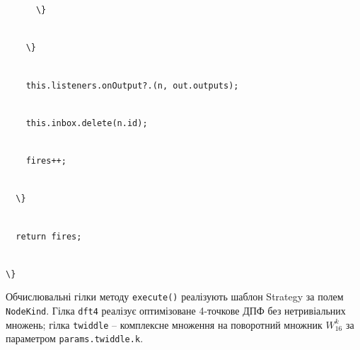 \documentclass[
]{article}
\newcommand{\passthrough}[1]{#1}
\begin{document}
\passthrough{\lstinline!      !}\passthrough{\lstinline!\}!}\strut \\
\passthrough{\lstinline!    !}\passthrough{\lstinline!\}!}\strut \\
\passthrough{\lstinline!    !}\passthrough{\lstinline!this!}\passthrough{\lstinline!.!}\passthrough{\lstinline!listeners!}\passthrough{\lstinline!.!}\passthrough{\lstinline!onOutput!}\passthrough{\lstinline!?.(!}\passthrough{\lstinline!n!}\passthrough{\lstinline!,!}\passthrough{\lstinline! !}\passthrough{\lstinline!out!}\passthrough{\lstinline!.!}\passthrough{\lstinline!outputs!}\passthrough{\lstinline!);!}\strut \\
\passthrough{\lstinline!    !}\passthrough{\lstinline!this!}\passthrough{\lstinline!.!}\passthrough{\lstinline!inbox!}\passthrough{\lstinline!.!}\passthrough{\lstinline!delete!}\passthrough{\lstinline!(!}\passthrough{\lstinline!n!}\passthrough{\lstinline!.!}\passthrough{\lstinline!id!}\passthrough{\lstinline!);!}\strut \\
\passthrough{\lstinline!    !}\passthrough{\lstinline!fires!}\passthrough{\lstinline!++;!}\strut \\
\passthrough{\lstinline!  !}\passthrough{\lstinline!\}!}\strut \\
\passthrough{\lstinline!  !}\passthrough{\lstinline!return!}\passthrough{\lstinline! !}\passthrough{\lstinline!fires!}\passthrough{\lstinline!;!}\strut \\
\passthrough{\lstinline!\}!}

Обчислювальні гілки методу
\passthrough{\lstinline!execute!}\passthrough{\lstinline!()!} реалізують
шаблон Strategy за полем \passthrough{\lstinline!NodeKind!}. Гілка
\passthrough{\lstinline!dft!}\passthrough{\lstinline!4!} реалізує
оптимізоване 4-точкове ДПФ без нетривіальних множень; гілка
\passthrough{\lstinline!twiddle!} -- комплексне множення на поворотний
множник \(W_{16}^{k}\) за параметром
\passthrough{\lstinline!params!}\passthrough{\lstinline!.!}\passthrough{\lstinline!twiddle!}\passthrough{\lstinline!.!}\passthrough{\lstinline!k!}.
\end{document}
